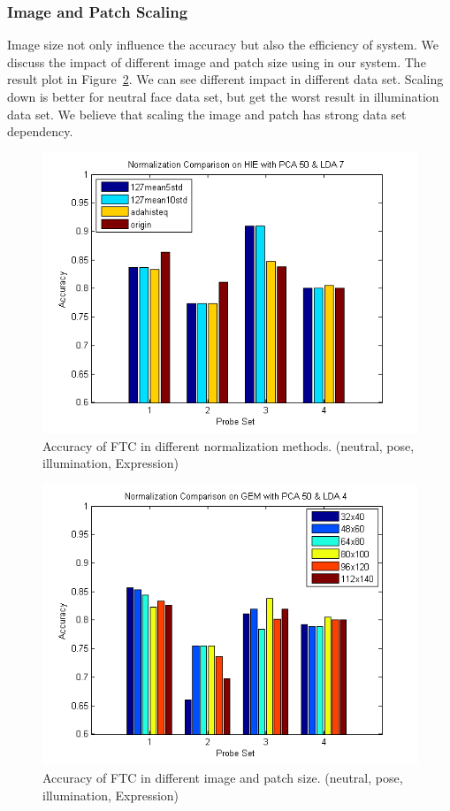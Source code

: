 \documentclass[10pt,twocolumn,letterpaper]{article}
\begin{document}
\subsubsection{Image and Patch Scaling}
Image size not only influence the accuracy but also the efficiency of system.
We discuss the impact of different image and patch size using in our system.
The result plot in Figure~\ref{fig:ftc_size}. We can see different impact
in different data set. Scaling down is better for neutral face data set,
but get the worst result in illumination data set. We believe that scaling
the image and patch has strong data set dependency.

\begin{figure}[t]
    \begin{center}
        \includegraphics[width=0.8\linewidth]{fig/ftc/ftc_normalization.png}
    \end{center}
    \caption{Accuracy of FTC in different normalization methods. (neutral, pose, illumination, Expression)}
    \label{fig:ftc_normalization}
\end{figure}

\begin{figure}[t]
    \begin{center}
        \includegraphics[width=0.8\linewidth]{fig/ftc/ftc_size.png}
    \end{center}
    \caption{Accuracy of FTC in different image and patch size. (neutral, pose, illumination, Expression)}
    \label{fig:ftc_size}
\end{figure}
\end{document}

